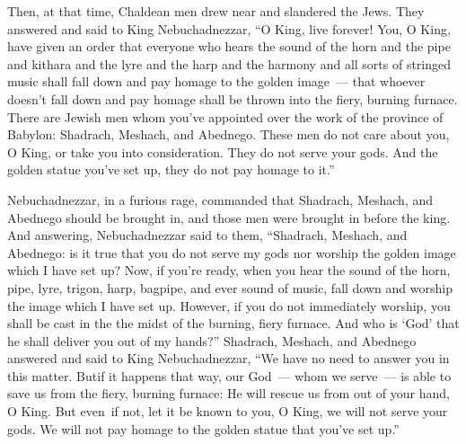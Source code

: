 \begin{inparaenum}
     Then, at that time, Chaldean men drew near and slandered the Jews.%
     They answered and said to King Nebuchadnezzar, ``O King, live forever!%
     You, O King, have given an order that everyone who hears the sound of the horn and the pipe and kithara and the lyre and the harp and the harmony and all sorts of stringed music shall fall down and pay homage to the golden image~---%
     that whoever doesn't fall down and pay homage shall be thrown into the fiery, burning furnace.%
     There are Jewish men whom you've appointed over the work of the province of Babylon: Shadrach, Meshach, and Abednego. These men do not care about you, O King, or take you into consideration. They do not serve your gods. And the golden statue you've set up, they do not pay homage to it.''\understood%
    
     Nebuchadnezzar, in a furious rage, commanded that Shadrach, Meshach, and Abednego should be brought in, and those men were brought in before the king.%
     And answering, Nebuchadnezzar said to them, ``Shadrach, Meshach, and Abednego: is it true that you do not serve my gods nor worship the golden image which I have set up?%
     Now, if you're ready, when you hear the sound of the horn, pipe, lyre, trigon, harp, bagpipe, and ever sound of music, fall down and worship the image which I have set up. However, if you do not immediately worship, you shall be cast in the the midst of the burning, fiery furnace. And who is `God' that he shall deliver you out of my hands?''%
     Shadrach, Meshach, and Abednego answered and said to King Nebuchadnezzar, ``We have no need to answer you in this matter.%
     But\understood if it happens that way, our God~--- whom we serve~--- is able to save us from the fiery, burning furnace: He will rescue us from out of your hand, O King.%
     But even\understood\ if not, let it be known to you, O King, we will not serve your gods. We will not pay homage to the golden statue that you've set up.''%
    

\end{inparaenum}
